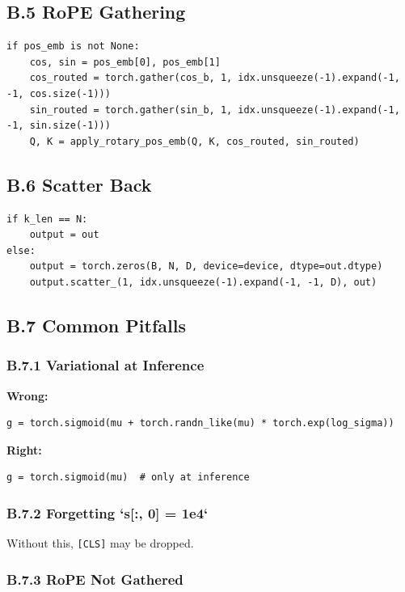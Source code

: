 \subsection{B.5 RoPE Gathering}

\begin{lstlisting}
if pos_emb is not None:
    cos, sin = pos_emb[0], pos_emb[1]
    cos_routed = torch.gather(cos_b, 1, idx.unsqueeze(-1).expand(-1, -1, cos.size(-1)))
    sin_routed = torch.gather(sin_b, 1, idx.unsqueeze(-1).expand(-1, -1, sin.size(-1)))
    Q, K = apply_rotary_pos_emb(Q, K, cos_routed, sin_routed)
\end{lstlisting}

\subsection{B.6 Scatter Back}

\begin{lstlisting}
if k_len == N:
    output = out
else:
    output = torch.zeros(B, N, D, device=device, dtype=out.dtype)
    output.scatter_(1, idx.unsqueeze(-1).expand(-1, -1, D), out)
\end{lstlisting}

\subsection{B.7 Common Pitfalls}

\subsubsection{B.7.1 Variational at Inference}

\textbf{Wrong:}
\begin{lstlisting}
g = torch.sigmoid(mu + torch.randn_like(mu) * torch.exp(log_sigma))
\end{lstlisting}

\textbf{Right:}
\begin{lstlisting}
g = torch.sigmoid(mu)  # only at inference
\end{lstlisting}

\subsubsection{B.7.2 Forgetting `s[:, 0] = 1e4`}

Without this, \texttt{[CLS]} may be dropped.

\subsubsection{B.7.3 RoPE Not Gathered}

